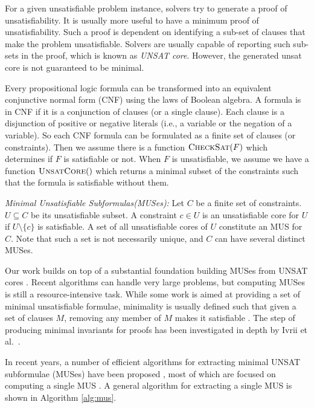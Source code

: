 For a given unsatisfiable problem instance, solvers try to generate a proof of unsatisfiability. It is usually more useful to have a minimum proof of unsatisfiability. Such a proof is dependent on identifying a sub-set of clauses that make the problem unsatisfiable. Solvers are usually capable of reporting such sub-sets in the proof, which is known as \emph{UNSAT core}. However, the generated unsat core is not guaranteed to be minimal.

Every propositional logic formula can be transformed into an equivalent conjunctive normal form (CNF) using the laws of Boolean algebra. A formula is in CNF if it is a conjunction of clauses (or a single clause). Each clause is a disjunction of positive or negative literals (i.e., a variable or the negation of a variable). So each CNF formula can be formulated as a finite set of clauses (or constraints). Then we assume there is a function $\textsc{CheckSat}(F)$ which determines if $F$ is satisfiable or not.
When $F$ is unsatisfiable, we assume we
have a function $\textsc{UnsatCore}()$ which returns a minimal subset of the
constraints such that the formula is satisfiable without them.

\begin{definition}{\emph{Minimal Unsatisfiable Subformulas(MUSes):}}
  \label{def:mus}
  Let $C$ be a finite set of constraints.
  $U \subseteq C$ be its unsatisfiable subset.
  A constraint $c \in U$ is an
  unsatisfiable core for $U$ if $U \setminus \{c\}$ is satisfiable.
  A set of all unsatisfiable cores of $U$ constitute
  an MUS for $C$.
  Note that such a set is not necessarily unique, and $C$ can have several distinct MUSes.
\end{definition}

Our work builds on top of a substantial foundation building
MUSes from UNSAT cores \cite{Cimatti2007:UNSAT}.  Recent algorithms can handle very large problems, but computing MUSes is still a resource-intensive task.  While some work is aimed at providing a set of minimal unsatisfiable formulae, minimality is usually defined such that given a set of clauses $M$, removing any member of $M$ makes it satisfiable \cite{belov2012computing}.  The step of producing minimal invariants for proofs has been investigated in depth by Ivrii et al.~\cite{Ivrii14:invariants}.

In  recent  years,  a  number  of  efficient algorithms  for  extracting minimal UNSAT subformulae (MUSes)  have  been proposed \cite{liffiton2005max},
most of which are focused on computing a single MUS  \cite{bacchus2015using, belov2012muser2, belov2013core, belov2012towards, nadel2014accelerated}. A general algorithm for extracting a single MUS is shown in Algorithm \ref{alg:mus}.

